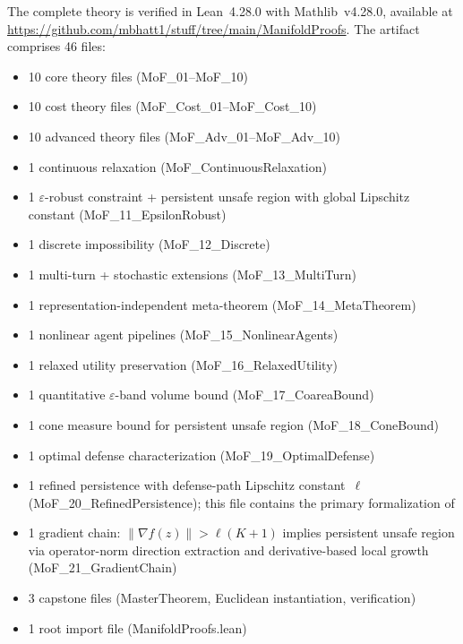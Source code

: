 \documentclass[11pt]{article}
\begin{document}
The complete theory is verified in Lean~4.28.0 with Mathlib~v4.28.0,
available at
\url{https://github.com/mbhatt1/stuff/tree/main/ManifoldProofs}.
The artifact comprises 46 files:
\begin{itemize}[nosep]
  \item 10 core theory files (MoF\_01--MoF\_10)
  \item 10 cost theory files (MoF\_Cost\_01--MoF\_Cost\_10)
  \item 10 advanced theory files (MoF\_Adv\_01--MoF\_Adv\_10)
  \item 1 continuous relaxation (MoF\_ContinuousRelaxation)
  \item 1 $\varepsilon$-robust constraint + persistent unsafe region
    with global Lipschitz constant
    (MoF\_11\_EpsilonRobust)
  \item 1 discrete impossibility (MoF\_12\_Discrete)
  \item 1 multi-turn + stochastic extensions
    (MoF\_13\_MultiTurn)
  \item 1 representation-independent meta-theorem
    (MoF\_14\_MetaTheorem)
  \item 1 nonlinear agent pipelines (MoF\_15\_NonlinearAgents)
  \item 1 relaxed utility preservation (MoF\_16\_RelaxedUtility)
  \item 1 quantitative $\varepsilon$-band volume bound
    (MoF\_17\_CoareaBound)
  \item 1 cone measure bound for persistent unsafe region
    (MoF\_18\_ConeBound)
  \item 1 optimal defense characterization
    (MoF\_19\_OptimalDefense)
  \item 1 refined persistence with defense-path Lipschitz constant~$\ell$
    (MoF\_20\_RefinedPersistence); this file contains the primary
    formalization of 
  \item 1 gradient chain: $\|\nabla f(z)\| > \ell(K+1)$ implies
    persistent unsafe region via operator-norm direction extraction
    and derivative-based local growth
    (MoF\_21\_GradientChain)
  \item 3 capstone files (MasterTheorem, Euclidean instantiation,
    verification)
  \item 1 root import file (ManifoldProofs.lean)
\end{itemize}
\end{document}
